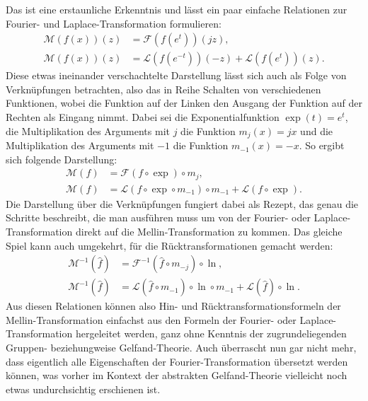 Das ist eine erstaunliche Erkenntnis und lässt ein paar einfache 
Relationen zur Fourier- und Laplace-Transformation formulieren:
\begin{align*}
    \mathcal{M}\left(f(x)\right)(z) 
    &= \mathcal{F}\left(f (e^{t})\right)(jz), \\
    \mathcal{M}\left(f(x)\right)(z) 
    &= \mathcal{L}\left(f (e^{-t})\right)(-z) 
    + \mathcal{L}\left(f (e^{t})\right)(z) 
    .
\end{align*}
Diese etwas ineinander verschachtelte Darstellung lässt sich auch als Folge von 
Verknüpfungen betrachten, also das in Reihe Schalten von verschiedenen 
Funktionen, wobei die Funktion auf der Linken den Ausgang der Funktion auf 
der Rechten als Eingang nimmt.
Dabei sei die Exponentialfunktion $\exp(t) = e^t$, die Multiplikation des 
Arguments mit $j$ die Funktion $m_j(x) = jx$ und die Multiplikation des 
Arguments mit $-1$ die Funktion $m_{-1}(x) = -x$.
So ergibt sich folgende Darstellung:
\begin{align*}
    \mathcal{M}(f) 
    &= \mathcal{F}(f\circ\exp)\circ m_j, \\
    \mathcal{M}(f) 
    &= \mathcal{L}(f\circ\exp\circ m_{-1})\circ m_{-1}
    + \mathcal{L}(f\circ\exp)
    .
    \label{mellin:relationsgleichungen}
\end{align*}
Die Darstellung über die Verknüpfungen fungiert dabei als Rezept, das genau 
die Schritte beschreibt, die man ausführen muss um von der Fourier- oder 
Laplace-Transformation direkt auf die Mellin-Transformation zu kommen. 
Das gleiche Spiel kann auch umgekehrt, für die Rücktransformationen 
gemacht werden:
\begin{align*}
    \mathcal{M}^{-1}(\hat{f}) 
    &= \mathcal{F}^{-1}(\hat{f}\circ m_{-j})\circ\ln, \\
    \mathcal{M}^{-1}(\hat{f}) 
    &= \mathcal{L}(\hat{f}\circ m_{-1})\circ\ln\circ m_{-1}
    + \mathcal{L}(\hat{f})\circ\ln
    .
\end{align*}
Aus diesen Relationen können also Hin- und Rücktransformationsformeln 
der Mellin-Trans\-for\-ma\-tion einfachst aus den Formeln der Fourier- oder 
Laplace-Transformation hergeleitet werden, ganz ohne Kenntnis der 
zugrundeliegenden Gruppen- beziehungweise Gelfand-Theorie.
Auch überrascht nun gar nicht mehr, dass eigentlich alle Eigenschaften 
der Fourier-Transformation übersetzt werden können, was vorher im Kontext 
der abstrakten Gelfand-Theorie vielleicht noch etwas undurchsichtig 
erschienen ist.

